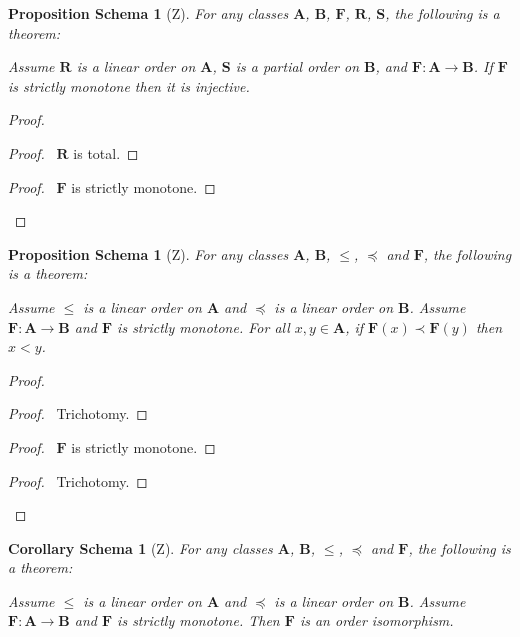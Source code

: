 \documentclass{book}
\let\qed\relax
\newtheorem{props}[ax]{Proposition Schema}
\newtheorem{cors}{Corollary Schema}[ax]
\theoremstyle{definition}
\begin{document}
\begin{props}[Z]
\label{prop:strictmonotoneinj}
For any classes $\mathbf{A}$, $\mathbf{B}$, $\mathbf{F}$, $\mathbf{R}$, $\mathbf{S}$, the following is a theorem:

Assume $\mathbf{R}$ is a linear order on $\mathbf{A}$, $\mathbf{S}$ is a partial order on $\mathbf{B}$, and $\mathbf{F} : \mathbf{A} \rightarrow \mathbf{B}$. If $\mathbf{F}$ is strictly monotone then it is injective.
\end{props}

\begin{proof}
\pf
{}
\begin{proof}
	\pf\ $\mathbf{R}$ is total.
\end{proof}
\begin{proof}
	\pf\ $\mathbf{F}$ is strictly monotone.
\end{proof}
\qed
\end{proof}

\begin{props}[Z]
\label{prop:strictmonotoneinv}
For any classes $\mathbf{A}$, $\mathbf{B}$, $\leq$, $\preccurlyeq$ and $\mathbf{F}$, the following is a theorem:

Assume $\leq$ is a linear order on $\mathbf{A}$ and $\preccurlyeq$ is a linear order on $\mathbf{B}$. Assume $\mathbf{F} : \mathbf{A} \rightarrow \mathbf{B}$ and $\mathbf{F}$ is strictly monotone. For all $x,y \in \mathbf{A}$, if $\mathbf{F}(x) \prec \mathbf{F}(y)$ then $x < y$.
\end{props}

\begin{proof}
\pf
{}
\begin{proof}
	\pf\ Trichotomy.
\end{proof}
\begin{proof}
	\pf\ $\mathbf{F}$ is strictly monotone.
\end{proof}
\begin{proof}
	\pf\ Trichotomy.
\end{proof}
\qed
\end{proof}

\begin{cors}[Z]
\label{cor:orderiso}
For any classes $\mathbf{A}$, $\mathbf{B}$, $\leq$, $\preccurlyeq$ and $\mathbf{F}$, the following is a theorem:

Assume $\leq$ is a linear order on $\mathbf{A}$ and $\preccurlyeq$ is a linear order on $\mathbf{B}$. Assume $\mathbf{F} : \mathbf{A} \rightarrow \mathbf{B}$ and $\mathbf{F}$ is strictly monotone. Then $\mathbf{F}$ is an order isomorphism.
\end{cors}
\end{document}
